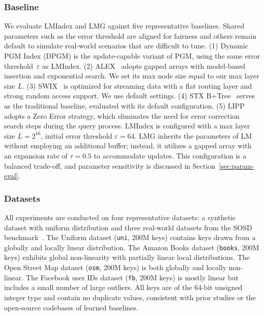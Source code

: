 \subsubsection{Baseline} We evaluate LMIndex and LMG against five representative baselines. Shared parameters such as the error threshold are aligned for fairness and others remain default to simulate real-world scenarios that are difficult to tune. (1) Dynamic PGM Index (DPGM) \cite{pgm20} is the update-capable variant of PGM, using the same error threshold~$\varepsilon$ as LMIndex. (2) ALEX~\cite{alex20} adopts gapped arrays with model-based insertion and exponential search. We set its max node size equal to our max layer size $\mathit{L}$. (3) SWIX~\cite{swix24} is optimized for streaming data with a flat routing layer and strong random access support. We use default settings. (4) STX B+Tree~\cite{stxbtree19} serves as the traditional baseline, evaluated with its default configuration. (5) LIPP \cite{lipp21, learned23} adopts a Zero Error strategy, which eliminates the need for error correction search steps during the query process. LMIndex is configured with a max layer size $\mathit{L}=2^{16}$, initial error threshold $\varepsilon=64$. LMG inherits the parameters of LM without employing an additional buffer; instead, it utilizes a gapped array with an expansion rate of $\tau=0.5$ to accommodate updates. This configuration is a balanced trade-off, and parameter sensitivity is discussed in Section~\ref{sec:param-eval}.

\subsubsection{Datasets}
All experiments are conducted on four representative datasets: a synthetic dataset with uniform distribution and three real-world datasets from the SOSD benchmark~\cite{sosd20}. The Uniform dataset (\texttt{uni}, 200M keys) contains keys drawn from a globally and locally linear distribution. The Amazon Books dataset (\texttt{books}, 200M keys) exhibits global non-linearity with partially linear local distributions. The Open Street Map dataset (\texttt{osm}, 200M keys) is both globally and locally non-linear. The Facebook user IDs dataset (\texttt{fb}, 200M keys) is mostly linear but includes a small number of large outliers. All keys are of the $64$-bit unsigned integer type and contain no duplicate values, consistent with prior studies or the open-source codebases of learned baselines.

